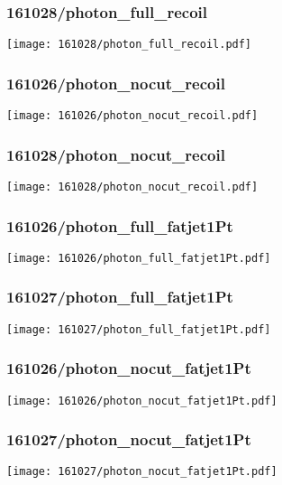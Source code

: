 \begin{frame}
   \frametitle{\small 161028/photon\_full\_recoil}
   \centering
   \texttt{[image: 161028/photon\_full\_recoil.pdf]}
\end{frame}

\begin{frame}
   \frametitle{\small 161026/photon\_nocut\_recoil}
   \centering
   \texttt{[image: 161026/photon\_nocut\_recoil.pdf]}
\end{frame}

\begin{frame}
   \frametitle{\small 161028/photon\_nocut\_recoil}
   \centering
   \texttt{[image: 161028/photon\_nocut\_recoil.pdf]}
\end{frame}

\begin{frame}
   \frametitle{\small 161026/photon\_full\_fatjet1Pt}
   \centering
   \texttt{[image: 161026/photon\_full\_fatjet1Pt.pdf]}
\end{frame}

\begin{frame}
   \frametitle{\small 161027/photon\_full\_fatjet1Pt}
   \centering
   \texttt{[image: 161027/photon\_full\_fatjet1Pt.pdf]}
\end{frame}

\begin{frame}
   \frametitle{\small 161026/photon\_nocut\_fatjet1Pt}
   \centering
   \texttt{[image: 161026/photon\_nocut\_fatjet1Pt.pdf]}
\end{frame}

\begin{frame}
   \frametitle{\small 161027/photon\_nocut\_fatjet1Pt}
   \centering
   \texttt{[image: 161027/photon\_nocut\_fatjet1Pt.pdf]}
\end{frame}

